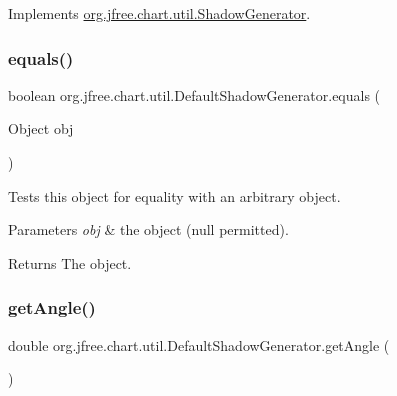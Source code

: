 Implements \mbox{\hyperlink{interfaceorg_1_1jfree_1_1chart_1_1util_1_1_shadow_generator_a8771623b832045a88620c5c5965d82eb}{org.\+jfree.\+chart.\+util.\+Shadow\+Generator}}.

\mbox{\label{classorg_1_1jfree_1_1chart_1_1util_1_1_default_shadow_generator_a6ee7c3198a4ddaa9d6b3533353555222}} 
\subsubsection{\texorpdfstring{equals()}{equals()}}
{\footnotesize\ttfamily boolean org.\+jfree.\+chart.\+util.\+Default\+Shadow\+Generator.\+equals (\begin{DoxyParamCaption}\item[{Object}]{obj }\end{DoxyParamCaption})}

Tests this object for equality with an arbitrary object.


\begin{DoxyParams}{Parameters}
{\em obj} & the object ({\ttfamily null} permitted).\\
\hline
\end{DoxyParams}
\begin{DoxyReturn}{Returns}
The object. 
\end{DoxyReturn}
\mbox{\label{classorg_1_1jfree_1_1chart_1_1util_1_1_default_shadow_generator_ac75c433ac75290b40b9882f888e64934}} 
\subsubsection{\texorpdfstring{get\+Angle()}{getAngle()}}
{\footnotesize\ttfamily double org.\+jfree.\+chart.\+util.\+Default\+Shadow\+Generator.\+get\+Angle (\begin{DoxyParamCaption}{ }\end{DoxyParamCaption})}

